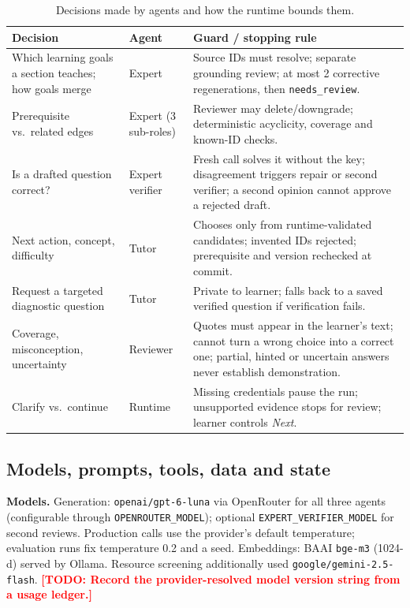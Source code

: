 \documentclass{article}
\newcommand{\todo}[1]{\textcolor{red}{\textbf{[TODO: #1]}}}
\newcommand{\code}[1]{\texttt{\small #1}}
\begin{document}
\begin{table}[H]
\centering
\small
\caption{Decisions made by agents and how the runtime bounds them.}
\begin{tabularx}{\linewidth}{@{}p{2.8cm}p{1.6cm}X@{}}
\toprule
\textbf{Decision} & \textbf{Agent} & \textbf{Guard / stopping rule} \\
\midrule
Which learning goals a section teaches; how goals merge & Expert & Source IDs must resolve; separate grounding review; at most 2 corrective regenerations, then \code{needs\_review}. \\
Prerequisite vs.\ related edges & Expert (3 sub-roles) & Reviewer may delete/downgrade; deterministic acyclicity, coverage and known-ID checks. \\
Is a drafted question correct? & Expert verifier & Fresh call solves it without the key; disagreement triggers repair or second verifier; a second opinion cannot approve a rejected draft. \\
Next action, concept, difficulty & Tutor & Chooses only from runtime-validated candidates; invented IDs rejected; prerequisite and version rechecked at commit. \\
Request a targeted diagnostic question & Tutor & Private to learner; falls back to a saved verified question if verification fails. \\
Coverage, misconception, uncertainty & Reviewer & Quotes must appear in the learner's text; cannot turn a wrong choice into a correct one; partial, hinted or uncertain answers never establish demonstration. \\
Clarify vs.\ continue & Runtime & Missing credentials pause the run; unsupported evidence stops for review; learner controls \emph{Next}. \\
\bottomrule
\end{tabularx}
\end{table}

\subsection{Models, prompts, tools, data and state}

\textbf{Models.} Generation: \code{openai/gpt-6-luna} via OpenRouter for all three agents (configurable through \code{OPENROUTER\_MODEL}); optional \code{EXPERT\_VERIFIER\_MODEL} for second reviews. Production calls use the provider's default temperature; evaluation runs fix temperature 0.2 and a seed. Embeddings: BAAI \code{bge-m3} (1024-d) served by Ollama. Resource screening additionally used \code{google/gemini-2.5-flash}. \todo{Record the provider-resolved model version string from a usage ledger.}
\end{document}
